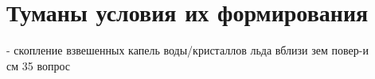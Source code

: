 
\section{Туманы условия их формирования}
- скопление взвешенных капель воды/кристаллов льда вблизи зем повер-и\\
см 35 вопрос